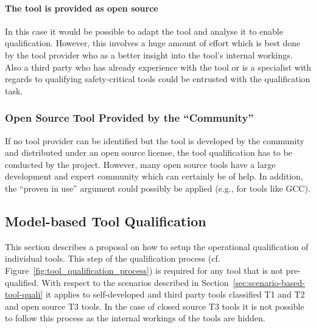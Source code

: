 \paragraph{The tool is provided as open source}

In this case it would be possible to adapt the tool and analyse it to enable qualification. However, this involves a huge amount of effort which is best done by the tool provider who as a better insight into the tool's internal workings. Also a third party who has already experience with the tool or is a specialist with regards to qualifying safety-critical tools could be entrusted with the qualification task.

\subsubsection{Open Source Tool Provided by the ``Community''}

If no tool provider can be identified but the tool is developed by the community and distributed under an open source license, the tool qualification has to be conducted by the project. However, many open source tools have a large development and expert community which can certainly be of help. In addition, the ``proven in use'' argument could possibly be applied (e.g., for tools like GCC).

\subsection{Model-based Tool Qualification}
\label{sec:model-based-tool-quali}

This section describes a proposal on how to setup the operational qualification of individual tools. This step of the qualification process (cf. Figure~\ref{fig:tool_qualification_process}) is required for any tool that is not pre-qualified. With respect to the scenarios described in Section~\ref{sec:scenario-based-tool-quali} it applies to self-developed and third party tools classified T1 and T2 and open source T3 tools. In the case of closed source T3 tools it is not possible to follow this process as the internal workings of the tools are hidden.

